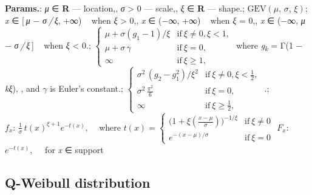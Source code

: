     {\color{darkblue} \textbf{Params.}:} {\textit{μ} ∈ \textbf{R} — location,,  \textit{σ} > 0 — scale,,  \textit{ξ} ∈ \textbf{R} — shape.}; {$\textrm{GEV}(\mu,\,\sigma,\,\xi)$}; {\textit{x} ∈ [ \textit{μ} − \textit{σ / ξ}, +∞)   when \textit{ξ} > 0,, \textit{x} ∈ (−∞, +∞)   when \textit{ξ} = 0,, \textit{x} ∈ (−∞, \textit{μ} − \textit{σ / ξ} ]   when \textit{ξ} < 0.}; {$\begin{cases}\mu + \sigma(g_1 - 1)/\xi & \text{if}\ \xi\neq 0,\xi<1,\\ \mu + \sigma\,\gamma & \text{if}\ \xi=0,\\ \infty & \text{if}\ \xi\geq 1,\end{cases}$ where \textit{g\textsubscript{k}} = Γ(1 − \textit{kξ}), ,  and $\gamma$ is Euler’s constant.}; {$\begin{cases}\sigma^2\,(g_2-g_1^2)/\xi^2 & \text{if}\ \xi\neq0,\xi<\frac12,\\ \sigma^2\,\frac{\pi^2}{6} & \text{if}\ \xi=0, \\ \infty & \text{if}\ \xi\geq\frac12,\end{cases}$ .};\hspace{0.5cm}\\{\color{darkblue} \textbf{$f_x$}:} {$\frac{1}{\sigma}\,t(x)^{\xi+1}e^{-t(x)},$   
where $t(x) = \begin{cases}\big(1+\xi(\tfrac{x-\mu}{\sigma})\big)^{-1/\xi} & \textrm{if}\ \xi\neq0 \\ e^{-(x-\mu)/\sigma} & \textrm{if}\ \xi=0\end{cases}$}{\color{darkblue} \textbf{$F_x$}:} {$e^{-t(x)},\,$   for \textit{x} ∈ support}



    
        
\subsection{Q-Weibull distribution}


